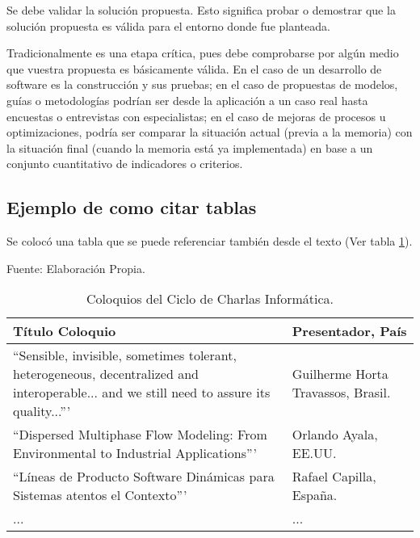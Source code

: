 
Se debe validar la solución propuesta. Esto significa probar o demostrar que la solución propuesta es válida para el entorno donde fue planteada.

Tradicionalmente es una etapa crítica, pues debe comprobarse por algún medio que vuestra propuesta es básicamente válida. En el caso de un desarrollo de software es la construcción y sus pruebas; en el caso de propuestas de modelos, guías o metodologías podrían ser desde la aplicación a un caso real hasta encuestas o entrevistas con especialistas; en el caso de mejoras de procesos u optimizaciones, podría ser comparar la situación actual (previa a la memoria) con la situación final (cuando la memoria está ya implementada) en base a un conjunto cuantitativo de indicadores o criterios.

\subsection{Ejemplo de como citar tablas}

Se colocó una tabla que se puede referenciar también desde el texto (Ver tabla \ref{table:coloquios}).

\begin{table}[h]
    \centering
    \caption{\label{table:coloquios} Coloquios del Ciclo de Charlas Informática.} Fuente: Elaboración Propia.
    \begin{tabular}{|p{7cm}|p{7cm}|}
        \hline
        Título Coloquio & Presentador, País \\
        \hline
        ``Sensible, invisible, sometimes tolerant, heterogeneous, decentralized and interoperable... and we still need to assure its quality...''' & Guilherme Horta Travassos, Brasil.\\
        \hline
        ``Dispersed Multiphase Flow Modeling: From Environmental to Industrial Applications''' & Orlando Ayala, EE.UU.\\
        \hline
        ``Líneas de Producto Software Dinámicas para Sistemas atentos el Contexto''' & Rafael Capilla, España.\\
        \hline
        ... & ... \\
        \hline
    \end{tabular}
\end{table}
